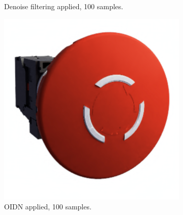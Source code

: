\begin{figure}[H]
\begin{subfigure}[t]{0.4\textwidth}
        \caption{Denoise filtering applied, 100 samples.}
        \label{fig:denoise-gaussian-100-samples}
    \end{subfigure}
    \hspace*{2cm}
    \vfill
    \vspace*{0.5cm}
    \hspace*{2cm}
    \begin{subfigure}[t]{0.4\textwidth}
        \includegraphics[width=\textwidth]{resources/denoise-oidn-100-samples.png}
        \caption{\gls{OIDN} applied, 100 samples.}
        \label{fig:denoise-oidn-100-samples}
    \end{subfigure}
    \hfill
    \begin{subfigure}[t]{0.4\textwidth}

\end{subfigure}
\end{figure}
